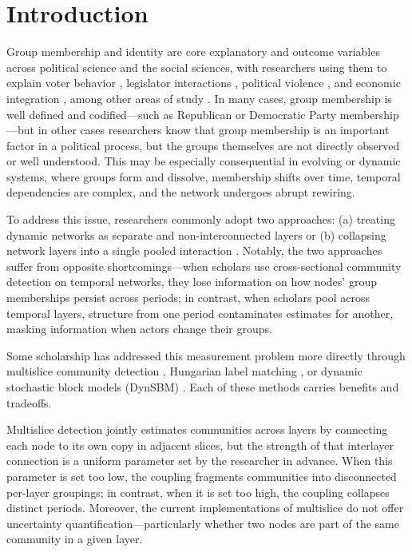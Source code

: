 \documentclass[11pt, letterpaper]{article}
\begin{document}
\newpage
\clearpage
\doublespacing
\newcommand{\best}[1]{\cellcolor{green!15}#1}
\section{Introduction}
Group membership and identity are core explanatory and outcome variables across political science and the social sciences, with researchers using them to explain voter behavior \citep{conevska2026partisan, huddy2015expressive, santoro2023political}, legislator interactions \citep{box_steffensmeier_2019_dear_colleague, Kim_Kunisky_2021}, political violence \citep{cederman2010why, dorff2020Nigeria}, and economic integration \citep{lupu2013trading}, among other areas of study \citep{hafnerburton2009network, renshon2016status}. In many cases, group membership is well defined and codified---such as Republican or Democratic Party membership---but in other cases researchers know that group membership is an important factor in a political process, but the groups themselves are not directly observed or well understood. This may be especially consequential in evolving or dynamic systems, where groups form and dissolve, membership shifts over time, temporal dependencies are complex, and the network undergoes abrupt rewiring.

To address this issue, researchers commonly adopt two approaches: (a) treating dynamic networks as separate and non-interconnected layers \citep{choi2026Jpr, edgerton2026human,lupu2017networked, renshon2016status} or (b) collapsing network layers into a single pooled interaction \citep{bearman2004chains, moody2004structure}. Notably, the two approaches suffer from opposite shortcomings---when scholars use cross-sectional community detection on temporal networks, they lose information on how nodes' group memberships
persist across periods; in contrast, when scholars pool across temporal layers, structure from one period contaminates estimates for another, masking information when actors change their groups.

Some scholarship has addressed this measurement problem more directly through multislice community detection \citep{beardsley2020hierarchy, cranmer2015kantian, mucha2010community}, Hungarian label matching \citep{greene2010tracking, kuhn1955hungarian}, or dynamic stochastic block models (DynSBM) \citep{matias2017statistical,  olivella2022dynamic}. Each of these methods carries benefits and tradeoffs. 

Multislice detection jointly estimates communities across layers by connecting each node to its own copy in adjacent slices, but the strength of that interlayer connection is a uniform parameter set by the researcher in advance. When this parameter is set too low, the coupling fragments communities into disconnected per-layer groupings; in contrast, when it is set too high, the coupling collapses distinct periods. Moreover, the current implementations of multislice do not offer uncertainty quantification---particularly whether two nodes are part of the same community in a given layer.
\end{document}
